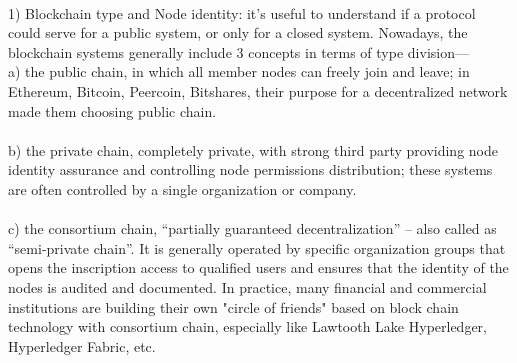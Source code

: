 \documentclass[]{article}
\begin{document}
\begin{CJK*}{UTF8}{gbsn}
\paragraph{}
1) Blockchain type and Node identity: it’s useful to understand if a protocol could serve for a public system, or only for a closed system. Nowadays, the blockchain systems generally include 3 concepts in terms of type division—
\\a)  the public chain, in which all member nodes can freely join and leave; in Ethereum, Bitcoin, Peercoin, Bitshares, their purpose for a decentralized network made them choosing public chain.
\\\\b) the private chain, completely private, with strong third party providing node identity assurance and controlling node permissions distribution; these systems are often controlled by a single organization or company.
\\\\c) the consortium chain, ``partially guaranteed decentralization'' – also called as ``semi-private chain''. It is generally operated by specific organization groups that opens the inscription access to qualified users and ensures that the identity of the nodes is audited and documented. In practice, many financial and commercial institutions are building their own "circle of friends" based on block chain technology with consortium chain, especially like Lawtooth Lake Hyperledger, Hyperledger Fabric, etc.
\paragraph{}


\end{CJK*}
\end{document}
